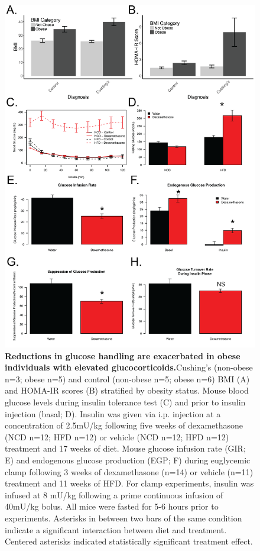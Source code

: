 \documentclass[11pt]{article} %
\begin{document}
\begin{figure}
  \begin{center}
    \includegraphics[width=\textwidth]{Figures_Figure_1.png}
  \end{center}
  \caption{\textbf{Reductions in glucose handling are exacerbated in obese individuals with elevated glucocorticoids.}Cushing’s (non-obese n=3; obese n=5) and control (non-obese n=5; obese n=6) BMI (A) and HOMA-IR scores (B) stratified by obesity status. Mouse blood glucose levels during insulin tolerance test (C) and prior to insulin injection (basal; D). Insulin was given via i.p. injection at a concentration of 2.5mU/kg following five weeks of dexamethasone (NCD n=12; HFD n=12) or vehicle (NCD n=12; HFD n=12) treatment and 17 weeks of diet. Mouse glucose infusion rate (GIR; E) and endogenous glucose production (EGP; F) during euglycemic clamp following 3 weeks of dexamethasone (n=14) or vehicle (n=11) treatment and 11 weeks of HFD. For clamp experiments, insulin was infused at 8 mU/kg following a prime continuous infusion of 40mU/kg bolus. All mice were fasted for 5-6 hours prior to experiments. Asterisks in between two bars of the same condition indicate a significant interaction between diet and treatment. Centered asterisks indicated statistically significant treatment effect.}
 \label{fig:1}
\end{figure}
\end{document}
